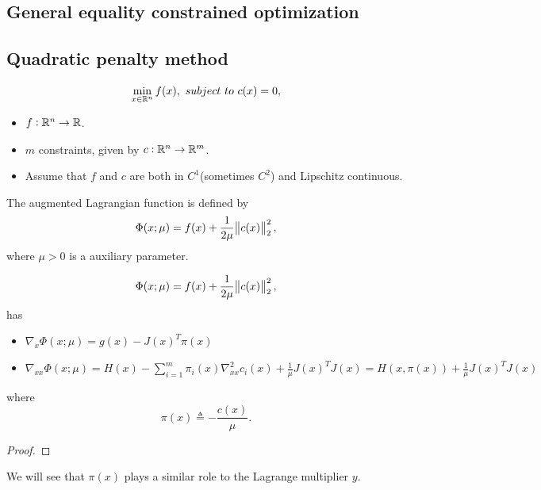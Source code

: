 \begin{refsection}
\section{General equality constrained optimization}
\subsection{Quadratic penalty method}

\begin{definition}
	$$\min_{x\in\mathbb{R}^n} f(x), ~subject~to~c(x) = 0,$$
\begin{itemize}
	\item $f:\mathbb{R}^n\to \mathbb{R}$.
	\item $m$ constraints, given by $c: \mathbb{R}^n \to \mathbb{R}^m$.
	\item Assume that $f$ and $c$ are both in $C^1$(sometimes $C^2$) and Lipschitz continuous.
\end{itemize}
\end{definition}


\begin{definition}
	The augmented Lagrangian function is defined by
	$$\Phi(x;\mu) = f(x) +  \frac{1}{2\mu}\norm{c(x)}_2^2,$$
	where $\mu > 0$ is a auxiliary parameter.
\end{definition}

\begin{lemma}
		$$\Phi(x;\mu) = f(x) +  \frac{1}{2\mu}\norm{c(x)}_2^2,$$
	has
	\begin{itemize}
		\item $\nabla_x \Phi(x;\mu) = g(x) - J(x)^T\pi(x)$
		\item $\nabla_{xx} \Phi(x;\mu) = H(x) - \sum_{i=1}^m \pi_i(x)\nabla_{xx}^2 c_i(x) + \frac{1}{\mu}J(x)^TJ(x) = H(x,\pi(x)) + \frac{1}{\mu}J(x)^TJ(x)$
	\end{itemize}
where $$\pi(x) \triangleq -\frac{c(x)}{\mu}.$$
\end{lemma}
\begin{proof}

\end{proof}

\begin{remark}[interpretation of $\pi$]
We will see that $\pi(x)$ plays a similar role to the Lagrange multiplier $y$.
\end{remark}



\end{refsection}
